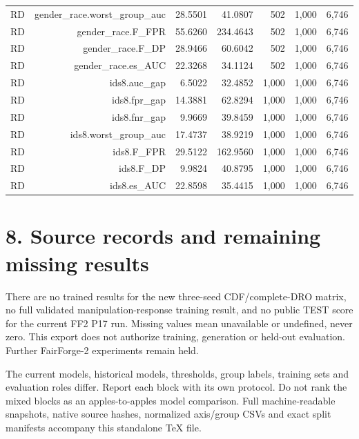 \documentclass[10pt]{article}
\begin{document}
\begin{longtable}{@{}lrrrrrr@{}}
RD & gender\_race.worst\_group\_auc & 28.5501 & 41.0807 & 502 & 1,000 & 6,746 \\
RD & gender\_race.F\_FPR & 55.6260 & 234.4643 & 502 & 1,000 & 6,746 \\
RD & gender\_race.F\_DP & 28.9466 & 60.6042 & 502 & 1,000 & 6,746 \\
RD & gender\_race.es\_AUC & 22.3268 & 34.1124 & 502 & 1,000 & 6,746 \\
RD & ids8.auc\_gap & 6.5022 & 32.4852 & 1,000 & 1,000 & 6,746 \\
RD & ids8.fpr\_gap & 14.3881 & 62.8294 & 1,000 & 1,000 & 6,746 \\
RD & ids8.fnr\_gap & 9.9669 & 39.8459 & 1,000 & 1,000 & 6,746 \\
RD & ids8.worst\_group\_auc & 17.4737 & 38.9219 & 1,000 & 1,000 & 6,746 \\
RD & ids8.F\_FPR & 29.5122 & 162.9560 & 1,000 & 1,000 & 6,746 \\
RD & ids8.F\_DP & 9.9824 & 40.8795 & 1,000 & 1,000 & 6,746 \\
RD & ids8.es\_AUC & 22.8598 & 35.4415 & 1,000 & 1,000 & 6,746 \\
\end{longtable}

\section*{8. Source records and remaining missing results}
There are no trained results for the new three-seed CDF/complete-DRO matrix, no full validated manipulation-response training result, and no public TEST score for the current FF2 P17 run. Missing values mean unavailable or undefined, never zero. This export does not authorize training, generation or held-out evaluation. Further FairForge-2 experiments remain held.

The current models, historical models, thresholds, group labels, training sets and evaluation roles differ. Report each block with its own protocol. Do not rank the mixed blocks as an apples-to-apples model comparison. Full machine-readable snapshots, native source hashes, normalized axis/group CSVs and exact split manifests accompany this standalone TeX file.
\end{document}
